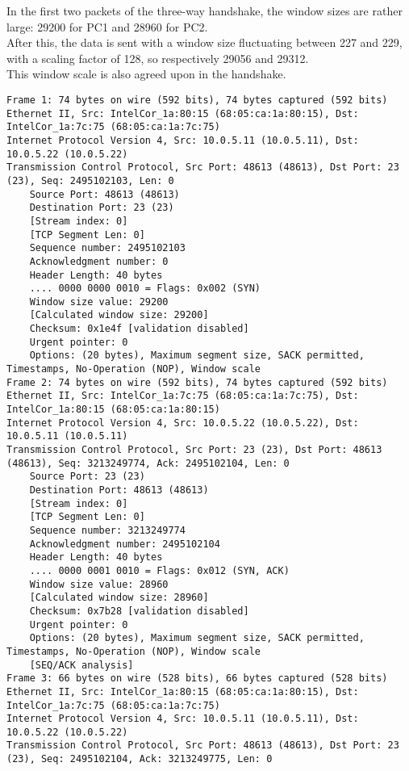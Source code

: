 In the first two packets of the three-way handshake, the window sizes are rather large: 29200 for PC1 and 28960 for PC2. \\
After this, the data is sent with a window size fluctuating between 227 and 229, with a scaling factor of 128, so respectively 29056 and 29312. \\

This window scale is also agreed upon in the handshake.
\\

\begin{lstlisting}
Frame 1: 74 bytes on wire (592 bits), 74 bytes captured (592 bits)
Ethernet II, Src: IntelCor_1a:80:15 (68:05:ca:1a:80:15), Dst: IntelCor_1a:7c:75 (68:05:ca:1a:7c:75)
Internet Protocol Version 4, Src: 10.0.5.11 (10.0.5.11), Dst: 10.0.5.22 (10.0.5.22)
Transmission Control Protocol, Src Port: 48613 (48613), Dst Port: 23 (23), Seq: 2495102103, Len: 0
    Source Port: 48613 (48613)
    Destination Port: 23 (23)
    [Stream index: 0]
    [TCP Segment Len: 0]
    Sequence number: 2495102103
    Acknowledgment number: 0
    Header Length: 40 bytes
    .... 0000 0000 0010 = Flags: 0x002 (SYN)
    Window size value: 29200
    [Calculated window size: 29200]
    Checksum: 0x1e4f [validation disabled]
    Urgent pointer: 0
    Options: (20 bytes), Maximum segment size, SACK permitted, Timestamps, No-Operation (NOP), Window scale
Frame 2: 74 bytes on wire (592 bits), 74 bytes captured (592 bits)
Ethernet II, Src: IntelCor_1a:7c:75 (68:05:ca:1a:7c:75), Dst: IntelCor_1a:80:15 (68:05:ca:1a:80:15)
Internet Protocol Version 4, Src: 10.0.5.22 (10.0.5.22), Dst: 10.0.5.11 (10.0.5.11)
Transmission Control Protocol, Src Port: 23 (23), Dst Port: 48613 (48613), Seq: 3213249774, Ack: 2495102104, Len: 0
    Source Port: 23 (23)
    Destination Port: 48613 (48613)
    [Stream index: 0]
    [TCP Segment Len: 0]
    Sequence number: 3213249774
    Acknowledgment number: 2495102104
    Header Length: 40 bytes
    .... 0000 0001 0010 = Flags: 0x012 (SYN, ACK)
    Window size value: 28960
    [Calculated window size: 28960]
    Checksum: 0x7b28 [validation disabled]
    Urgent pointer: 0
    Options: (20 bytes), Maximum segment size, SACK permitted, Timestamps, No-Operation (NOP), Window scale
    [SEQ/ACK analysis]
Frame 3: 66 bytes on wire (528 bits), 66 bytes captured (528 bits)
Ethernet II, Src: IntelCor_1a:80:15 (68:05:ca:1a:80:15), Dst: IntelCor_1a:7c:75 (68:05:ca:1a:7c:75)
Internet Protocol Version 4, Src: 10.0.5.11 (10.0.5.11), Dst: 10.0.5.22 (10.0.5.22)
Transmission Control Protocol, Src Port: 48613 (48613), Dst Port: 23 (23), Seq: 2495102104, Ack: 3213249775, Len: 0

\end{lstlisting}
